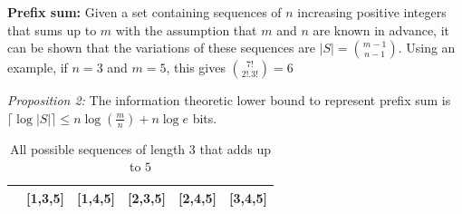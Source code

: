 \textbf{Prefix sum:} Given a set containing sequences of $n$ increasing positive integers that sums up to $m$ with the assumption that $m$ and $n$ are known in advance, it can be shown that the variations of these sequences are $|S| = \binom{m-1}{n-1}$. Using an example, if $n = 3$ and $m = 5$, this gives $\binom{7!}{2!.3!} = 6$ \par
\textit{Proposition 2:} The information theoretic lower bound to represent prefix sum is $\lceil \log |S| \rceil \leq n\log (\frac{m}{n}) + n\log e$ bits. \newline

\begin{table}[H]
    \centering
    \begin{tabular}{|c|c|c|c|c|c|}\hline
        [1,2,5]&[1,3,5]&[1,4,5]&[2,3,5]&[2,4,5]&[3,4,5]\\ \hline
    \end{tabular}
    \caption{All possible sequences of length $3$ that adds up to $5$}
    \label{tab:sequences-sum5}
\end{table}

